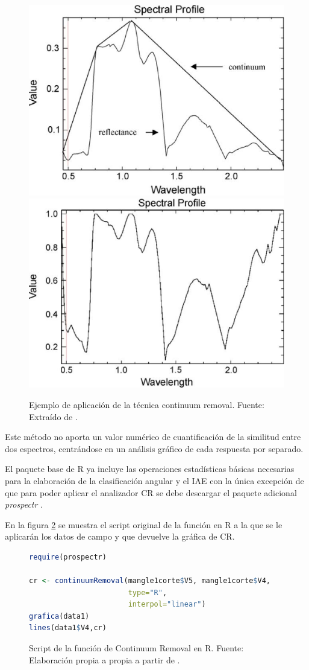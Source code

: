 \begin{figure}
	\centering
	\includegraphics[width=0.5\linewidth]{./Imagenes/CR1.eps}
	\includegraphics[width=0.5\linewidth]{./Imagenes/CR2.eps}
	\caption[Continuum Removal ejemplo]{Ejemplo de aplicación de la técnica continuum removal. Fuente: Extraído de \cite{huang2004estimating}.}
	\label{fig:ejemploCR}
\end{figure}

Este método no aporta un valor numérico de cuantificación de la similitud entre dos espectros, centrándose en un análisis gráfico de cada respuesta por separado.\Sep

El paquete base de R ya incluye las operaciones estadísticas básicas necesarias para la elaboración de la clasificación angular y el \ac{IAE} con la única excepción de que para poder aplicar el analizador \ac{CR} se debe descargar el paquete adicional \textit{prospectr} \citep{stevens2014introduction}.\Sep

En la figura \ref{fig:CR} se muestra el script original de la función en R a la que se le aplicarán los datos de campo y que devuelve la gráfica de \ac{CR}.\Sep

\begin{figure}
\centering
\begin{lstlisting}[language = R, frame = single]
require(prospectr)

cr <- continuumRemoval(mangle1corte$V5, mangle1corte$V4,
                       type="R",
                       interpol="linear")
grafica(data1)
lines(data1$V4,cr)
\end{lstlisting}
\caption[Función de Continuum Removal]{Script de la función de Continuum Removal en R. Fuente: Elaboración propia a propia a partir de \cite{stevens2014introduction}.}
\label{fig:CR}
\end{figure}

